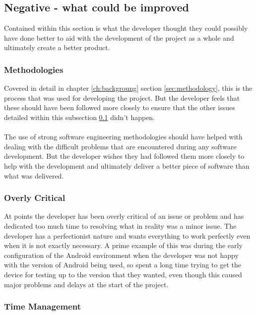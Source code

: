 \subsection{Negative - what could be improved}
\label{sec:negative_personal}

Contained within this section is what the developer thought they could possibly have done better to aid with the development of the project as a whole and ultimately create a better product. 

\subsubsection{Methodologies}

Covered in detail in chapter \ref{ch:backgroung} section \ref{sec:methodology}, this is the process that was used for developing the project. But the developer feels that these should have been followed more closely to ensure that the other issues detailed within this subsection \ref{sec:negative_personal} didn't happen.\\
\\
The use of strong software engineering methodologies should have helped with dealing with the difficult problems that are encountered during any software development. But the developer wishes they had followed them more closely to help with the development and ultimately deliver a better piece of software than what was delivered.

\subsubsection{Overly Critical}

At points the developer has been overly critical of an issue or problem and has dedicated too much time to resolving what in reality was a minor issue. The developer has a perfectionist nature and wants everything to work perfectly even when it is not exactly necessary. A prime example of this was during the early configuration of the Android environment when the developer was not happy with the version of Android being used, so spent a long time trying to get the device for testing up to the version that they wanted, even though this caused major problems and delays at the start of the project.

\subsubsection{Time Management}
\label{sec:time_management}

